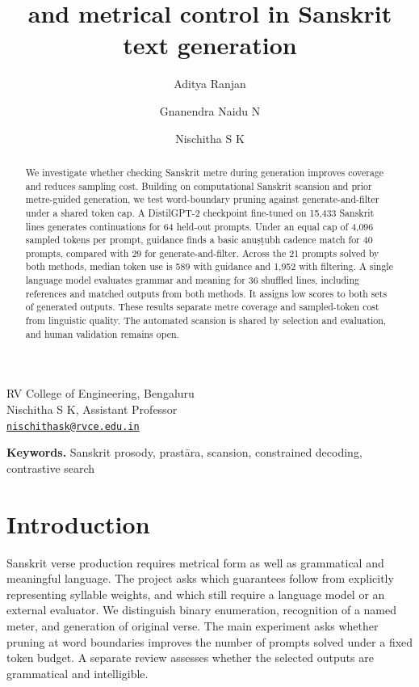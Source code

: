 \documentclass[11pt]{article}
\title{\rtext{Prastāra} and metrical control in Sanskrit text generation}
\author{Aditya Ranjan \and Gnanendra Naidu N \and Nischitha S K}
\date{}
\newcommand{\rtext}[1]{#1}
\begin{document}
\maketitle
\begin{center}
\small RV College of Engineering, Bengaluru\\
Nischitha S K, Assistant Professor\\
\href{mailto:nischithask@rvce.edu.in}{\texttt{nischithask@rvce.edu.in}}
\end{center}
\begin{abstract}
We investigate whether checking Sanskrit metre during generation improves coverage and reduces sampling cost. Building on computational Sanskrit scansion and prior metre-guided generation, we test word-boundary pruning against generate-and-filter under a shared token cap. A DistilGPT-2 checkpoint fine-tuned on 15,433 Sanskrit lines generates continuations for 64 held-out prompts. Under an equal cap of 4,096 sampled tokens per prompt, guidance finds a basic \rtext{anuṣṭubh} cadence match for 40 prompts, compared with 29 for generate-and-filter. Across the 21 prompts solved by both methods, median token use is 589 with guidance and 1,952 with filtering. A single language model evaluates grammar and meaning for 36 shuffled lines, including references and matched outputs from both methods. It assigns low scores to both sets of generated outputs. These results separate metre coverage and sampled-token cost from linguistic quality. The automated scansion is shared by selection and evaluation, and human validation remains open.
\end{abstract}
\noindent\textbf{Keywords.} Sanskrit prosody, \rtext{prastāra}, scansion, constrained decoding, contrastive search

\section{Introduction}
Sanskrit verse production requires metrical form as well as grammatical and meaningful language. The project asks which guarantees follow from explicitly representing syllable weights, and which still require a language model or an external evaluator. We distinguish binary enumeration, recognition of a named meter, and generation of original verse. The main experiment asks whether pruning at word boundaries improves the number of prompts solved under a fixed token budget. A separate review assesses whether the selected outputs are grammatical and intelligible.
\end{document}
